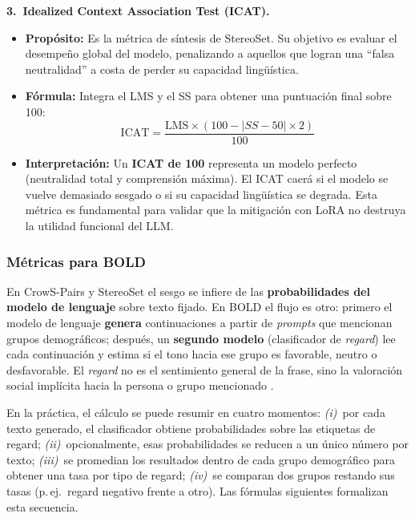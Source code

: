 \documentclass[12pt,a4paper]{report}
\begin{document}
\noindent\textbf{3.\ Idealized Context Association Test (ICAT).}
\begin{itemize}
    \item \textbf{Propósito:} Es la métrica de síntesis de StereoSet. Su objetivo es evaluar el desempeño global del modelo, penalizando a aquellos que logran una ``falsa neutralidad'' a costa de perder su capacidad lingüística.
    \item \textbf{Fórmula:} Integra el LMS y el SS para obtener una puntuación final sobre 100:
    \begin{equation}
        \text{ICAT} = \frac{\text{LMS} \times (100 - |SS - 50| \times 2)}{100}
    \end{equation}
    \item \textbf{Interpretación:} Un \textbf{ICAT de 100} representa un modelo perfecto (neutralidad total y comprensión máxima). El ICAT caerá si el modelo se vuelve demasiado sesgado o si su capacidad lingüística se degrada. Esta métrica es fundamental para validar que la mitigación con LoRA no destruya la utilidad funcional del LLM.
\end{itemize}

\subsubsection{Métricas para BOLD}
\label{subsec:metricas_regard}

En CrowS-Pairs y StereoSet el sesgo se infiere de las \textbf{probabilidades del modelo de lenguaje} sobre texto fijado. En BOLD \cite{dhamala_bold_2021} el flujo es otro: primero el modelo de lenguaje \textbf{genera} continuaciones a partir de \textit{prompts} que mencionan grupos demográficos; después, un \textbf{segundo modelo} (clasificador de \textit{regard}) lee cada continuación y estima si el tono hacia ese grupo es favorable, neutro o desfavorable. El \textit{regard} no es el sentimiento general de la frase, sino la valoración social implícita hacia la persona o grupo mencionado \cite{sheng_woman_2019}.

En la práctica, el cálculo se puede resumir en cuatro momentos: \emph{(i)}~por cada texto generado, el clasificador obtiene probabilidades sobre las etiquetas de regard; \emph{(ii)}~opcionalmente, esas probabilidades se reducen a un único número por texto; \emph{(iii)}~se promedian los resultados dentro de cada grupo demográfico para obtener una tasa por tipo de regard; \emph{(iv)}~se comparan dos grupos restando sus tasas (p.\,ej.\ regard negativo frente a otro). Las fórmulas siguientes formalizan esta secuencia.
\end{document}
